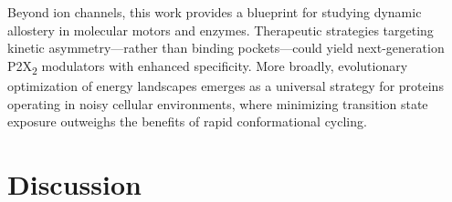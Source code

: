 \documentclass[a4paper,12pt]{article}
\begin{document}
	Beyond ion channels, this work provides a blueprint for studying dynamic allostery in molecular motors and enzymes. Therapeutic strategies targeting kinetic asymmetry—rather than binding pockets—could yield next-generation P2X\textsubscript{2} modulators with enhanced specificity. More broadly, evolutionary optimization of energy landscapes emerges as a universal strategy for proteins operating in noisy cellular environments, where minimizing transition state exposure outweighs the benefits of rapid conformational cycling.
	
	\section{Discussion}

\end{document}
